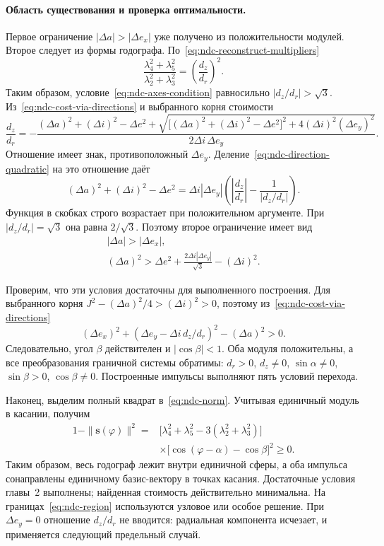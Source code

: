 \paragraph{Область существования и проверка оптимальности.}
Первое ограничение $|\Delta a|>|\Delta e_x|$ уже получено
из положительности модулей. Второе следует из формы годографа.
По~\eqref{eq:ndc-reconstruct-multipliers}
\[
 \frac{\lambda_4^2+\lambda_5^2}{\lambda_2^2+\lambda_3^2}
 =\left(\frac{d_z}{d_r}\right)^2.
\]
Таким образом, условие~\eqref{eq:ndc-axes-condition} равносильно
$|d_z/d_r|>\sqrt3$. Из~\eqref{eq:ndc-cost-via-directions}
и выбранного корня стоимости
\[
 \frac{d_z}{d_r}=-\frac{
 (\Delta a)^2+(\Delta i)^2-\Delta e^2+
 \sqrt{\bigl[(\Delta a)^2+(\Delta i)^2-\Delta e^2\bigr]^2
                    +4(\Delta i)^2(\Delta e_y)^2}}
 {2\Delta i\,\Delta e_y}.
\]
Отношение имеет знак, противоположный $\Delta e_y$.
Деление~\eqref{eq:ndc-direction-quadratic} на это отношение даёт
\[
 (\Delta a)^2+(\Delta i)^2-\Delta e^2
 =\Delta i|\Delta e_y|
       \left(\left|\frac{d_z}{d_r}\right|
                         -\frac{1}{|d_z/d_r|}\right).
\]
Функция в скобках строго возрастает при положительном аргументе.
При $|d_z/d_r|=\sqrt3$ она равна $2/\sqrt3$.
Поэтому второе ограничение имеет вид
\begin{equation}
 \boxed{\begin{gathered}
 |\Delta a|>|\Delta e_x|,\\
 (\Delta a)^2>\Delta e^2+
              \frac{2\Delta i|\Delta e_y|}{\sqrt3}-(\Delta i)^2.
 \end{gathered}}
 \label{eq:ndc-region}
\end{equation}

Проверим, что эти условия достаточны для выполненного построения.
Для выбранного корня $J^2-(\Delta a)^2/4>(\Delta i)^2>0$,
поэтому из~\eqref{eq:ndc-cost-via-directions}
\[
 (\Delta e_x)^2+(\Delta e_y-\Delta i\,d_z/d_r)^2-(\Delta a)^2>0.
\]
Следовательно, угол $\beta$ действителен и $|\cos\beta|<1$.
Оба модуля положительны, а все преобразования граничной системы
обратимы: $d_r>0$, $d_z\ne0$, $\sin\alpha\ne0$,
$\sin\beta>0$, $\cos\beta\ne0$.
Построенные импульсы выполняют пять условий перехода.

Наконец, выделим полный квадрат в~\eqref{eq:ndc-norm}.
Учитывая единичный модуль в касании, получим
\begin{equation}
\begin{aligned}
 1-\|\boldsymbol s(\varphi)\|^2
 ={}&\bigl[\lambda_4^2+\lambda_5^2
                         -3(\lambda_2^2+\lambda_3^2)\bigr]\\
 &\times\bigl[\cos(\varphi-\alpha)-\cos\beta\bigr]^2\geq0.
\end{aligned}
\label{eq:ndc-optimality-certificate}
\end{equation}
Таким образом, весь годограф лежит внутри единичной сферы,
а оба импульса сонаправлены единичному базис-вектору в точках
касания. Достаточные условия главы~2 выполнены; найденная
стоимость действительно минимальна.
На границах~\eqref{eq:ndc-region} используются узловое или
особое решение. При $\Delta e_y=0$ отношение $d_z/d_r$
не вводится: радиальная компонента исчезает, и применяется
следующий предельный случай.


